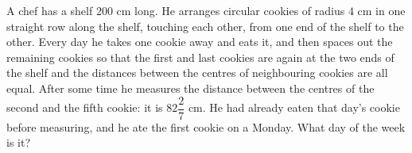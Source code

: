 A chef has a shelf $200$ cm long. He arranges circular cookies of radius $4$ cm in one straight row along the shelf, touching each other, from one end of the shelf to the other. Every day he takes one cookie away and eats it, and then spaces out the remaining cookies so that the first and last cookies are again at the two ends of the shelf and the distances between the centres of neighbouring cookies are all equal. After some time he measures the distance between the centres of the second and the fifth cookie: it is $82\dfrac{2}{7}$ cm. He had already eaten that day's cookie before measuring, and he ate the first cookie on a Monday. What day of the week is it?
